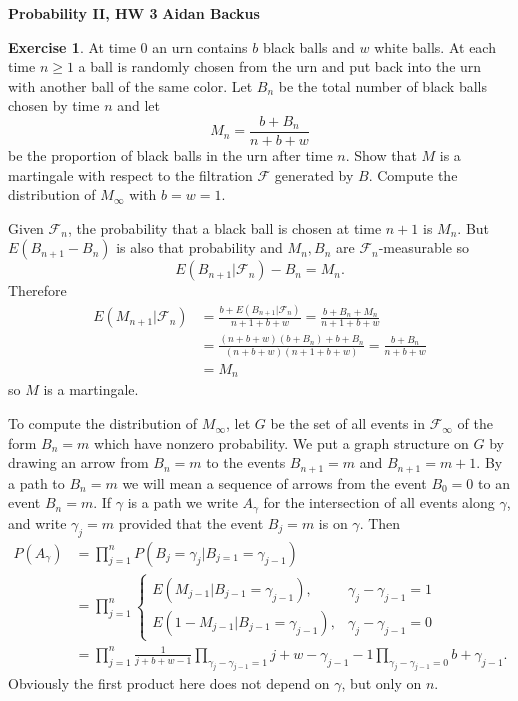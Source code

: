\documentclass[10pt]{article}
\theoremstyle{definition}
\newtheorem{exer}{Exercise}
\begin{document}
\noindent
\large\textbf{Probability II, HW 3} \hfill \textbf{Aidan Backus} \\

\begin{exer}
At time $0$ an urn contains $b$ black balls and $w$ white balls.
At each time $n \geq 1$ a ball is randomly chosen from the urn and put back into the urn with another ball of the same color.
Let $B_n$ be the total number of black balls chosen by time $n$ and let
$$M_n = \frac{b + B_n}{n + b + w}$$
be the proportion of black balls in the urn after time $n$.
Show that $M$ is a martingale with respect to the filtration $\mathcal F$ generated by $B$.
Compute the distribution of $M_\infty$ with $b = w = 1$.
\end{exer}

Given $\mathcal F_n$, the probability that a black ball is chosen at time $n + 1$ is $M_n$.
But $E(B_{n+1} - B_n)$ is also that probability and $M_n,B_n$ are $\mathcal F_n$-measurable so
$$E(B_{n+1}|\mathcal F_n) - B_n = M_n.$$
Therefore
\begin{align*}
E(M_{n+1}|\mathcal F_n) &= \frac{b + E(B_{n+1}|\mathcal F_n)}{n + 1 + b + w} = \frac{b + B_n + M_n}{n + 1 + b + w}\\
&= \frac{(n + b + w)(b + B_n) + b + B_n}{(n + b + w)(n + 1 + b + w)} = \frac{b + B_n}{n + b + w} \\
&= M_n\end{align*}
so $M$ is a martingale.

To compute the distribution of $M_\infty$, let $G$ be the set of all events in $\mathcal F_\infty$ of the form $B_n = m$ which have nonzero probability.
We put a graph structure on $G$ by drawing an arrow from $B_n = m$ to the events $B_{n+1} = m$ and $B_{n+1} = m + 1$.
By a path to $B_n = m$ we will mean a sequence of arrows from the event $B_0 = 0$ to an event $B_n = m$.
If $\gamma$ is a path we write $A_\gamma$ for the intersection of all events along $\gamma$, and write $\gamma_j = m$ provided that the event $B_j = m$ is on $\gamma$.
Then
\begin{align*}
P(A_\gamma) &= \prod_{j=1}^n P(B_j = \gamma_j|B_{j=1} = \gamma_{j-1})\\
&= \prod_{j=1}^n \begin{cases}
E(M_{j-1}|B_{j-1} = \gamma_{j-1}), &\gamma_j - \gamma_{j-1} = 1\\
E(1 - M_{j-1}|B_{j-1} = \gamma_{j-1}), &\gamma_j - \gamma_{j-1} = 0
\end{cases}\\
&= \prod_{j=1}^n \frac{1}{j+b+w-1}\prod_{\gamma_j - \gamma_{j-1} = 1} j + w - \gamma_{j-1} - 1 \prod_{\gamma_j - \gamma_{j-1} = 0} b + \gamma_{j - 1}.
\end{align*}
Obviously the first product here does not depend on $\gamma$, but only on $n$.
\end{document}
